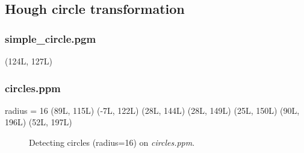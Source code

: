 \documentclass[paper=a4, fontsize=11pt]{scrartcl}
\numberwithin{equation}{section}		%
\numberwithin{figure}{section}			%
\begin{document}
\subsection{Hough circle transformation}

\subsubsection{simple\_circle.pgm}

(124L, 127L)

\subsubsection{circles.ppm}

radius = 16
(89L, 115L)
(-7L, 122L)
(28L, 144L)
(28L, 149L)
(25L, 150L)
(90L, 196L)
(52L, 197L)

\begin{figure}[h]
\centering
{}
\caption{Detecting circles (radius=16) on \emph{circles.ppm}.}
\label{fig:hough:circle:16}
\end{figure}
\end{document}
